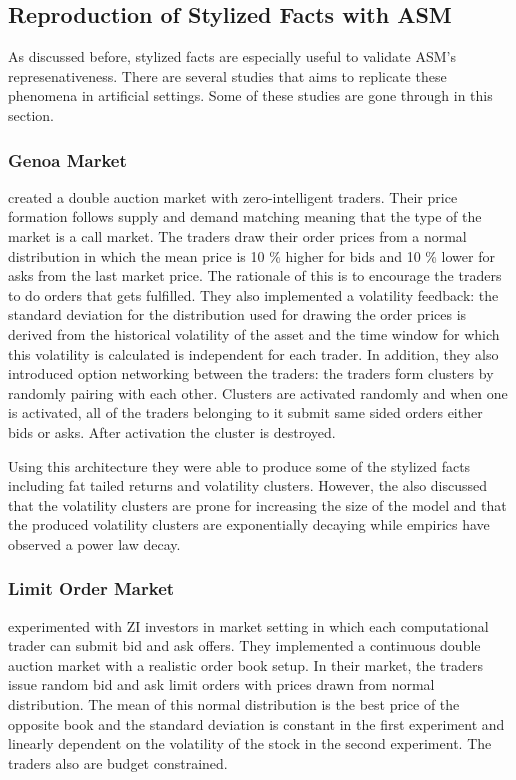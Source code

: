 
\subsection{Reproduction of Stylized Facts with ASM}
As discussed before, stylized facts are especially useful
to validate ASM's represenativeness. There are several 
studies that aims to replicate these phenomena in 
artificial settings. Some of these studies are
gone through in this section.
% 
\subsubsection{Genoa Market}

\citet{Genoa01} created a double auction market with zero-intelligent 
traders. Their price formation follows supply and demand matching meaning 
that the type of the market is a call market. The traders draw their 
order prices from a normal distribution in which the mean price is 10 \%
higher for bids and 10 \% lower for asks from the last market price. The
rationale of this is to encourage the traders to do orders that gets fulfilled.
They also implemented a volatility feedback: the standard deviation for 
the distribution used for drawing the order prices is derived from the 
historical volatility of the asset and the time window for which this
volatility is calculated is independent for each trader. In addition,
they also introduced option networking between the traders: the traders
form clusters by randomly pairing with each other. Clusters are activated
randomly and when one is activated, all of the traders belonging to it
submit same sided orders either bids or asks. After activation the cluster is destroyed.

Using this architecture they were able to produce some of the stylized facts
including fat tailed returns and volatility clusters. However, the also discussed
that the volatility clusters are prone for increasing the size of the model and
that the produced volatility clusters are exponentially decaying while empirics have
observed a power law decay.

\subsubsection{Limit Order Market}
\citet{Raberto05} experimented with ZI investors in market setting
in which each computational trader can submit bid and ask offers. They
implemented a continuous double auction market with a realistic order
book setup. In their market, the traders issue random bid and ask limit
orders with prices drawn from normal distribution. The mean of this 
normal distribution is the best price of the opposite book and the 
standard deviation is constant in the first experiment and linearly 
dependent on the volatility of the stock in the second experiment. The
traders also are budget constrained. \\


